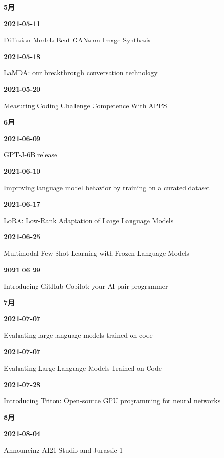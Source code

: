 \medskip
\noindent\textbf{5月}\par
\smallskip
\noindent\textbf{2021-05-11}\par
{\raggedright Diffusion Models Beat GANs on Image Synthesis\par}
\smallskip
\noindent\textbf{2021-05-18}\par
{\raggedright LaMDA: our breakthrough conversation technology\par}
\smallskip
\noindent\textbf{2021-05-20}\par
{\raggedright Measuring Coding Challenge Competence With APPS\par}
\smallskip
\medskip
\noindent\textbf{6月}\par
\smallskip
\noindent\textbf{2021-06-09}\par
{\raggedright GPT-J-6B release\par}
\smallskip
\noindent\textbf{2021-06-10}\par
{\raggedright Improving language model behavior by training on a curated dataset\par}
\smallskip
\noindent\textbf{2021-06-17}\par
{\raggedright LoRA: Low-Rank Adaptation of Large Language Models\par}
\smallskip
\noindent\textbf{2021-06-25}\par
{\raggedright Multimodal Few-Shot Learning with Frozen Language Models\par}
\smallskip
\noindent\textbf{2021-06-29}\par
{\raggedright Introducing GitHub Copilot: your AI pair programmer\par}
\smallskip
\medskip
\noindent\textbf{7月}\par
\smallskip
\noindent\textbf{2021-07-07}\par
{\raggedright Evaluating large language models trained on code\par}
\smallskip
\noindent\textbf{2021-07-07}\par
{\raggedright Evaluating Large Language Models Trained on Code\par}
\smallskip
\noindent\textbf{2021-07-28}\par
{\raggedright Introducing Triton: Open-source GPU programming for neural networks\par}
\smallskip
\medskip
\noindent\textbf{8月}\par
\smallskip
\noindent\textbf{2021-08-04}\par
{\raggedright Announcing AI21 Studio and Jurassic-1\par}
